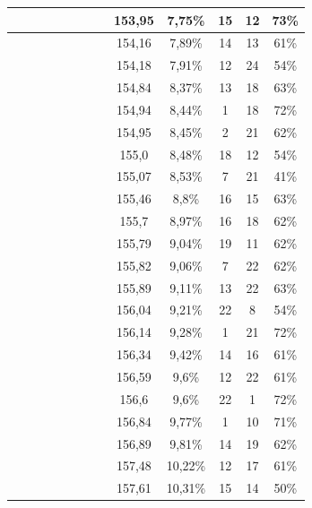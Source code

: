 \begin{center}
\begin{longtable}{|c|c|c|c|c|c|c|c|c|c|c|c|c|}
 \x &  &  &  &  \x &  \x &  &  \x & 153,95 & 7,75\% & 15 & 12 & 73\% \\ \hline
 \x &  &  \x &  &  \x &  &  &  \x & 154,16 & 7,89\% & 14 & 13 & 61\% \\ \hline
 \x &  \x &  &  \x &  &  &  &  \x & 154,18 & 7,91\% & 12 & 24 & 54\% \\ \hline
 \x &  \x &  \x &  \x &  &  &  \x &  \x & 154,84 & 8,37\% & 13 & 18 & 63\% \\ \hline
 \x &  &  &  \x &  \x &  \x &  \x &  \x & 154,94 & 8,44\% & 1 & 18 & 72\% \\ \hline
 \x &  \x &  \x &  \x &  &  &  \x &  \x & 154,95 & 8,45\% & 2 & 21 & 62\% \\ \hline
 \x &  \x &  &  \x &  &  &  \x &  \x & 155,0 & 8,48\% & 18 & 12 & 54\% \\ \hline
 \x &  &  &  &  &  &  &  \x & 155,07 & 8,53\% & 7 & 21 & 41\% \\ \hline
 \x &  \x &  \x &  &  \x &  &  \x &  \x & 155,46 & 8,8\% & 16 & 15 & 63\% \\ \hline
 \x &  &  \x &  \x &  \x &  &  \x &  \x & 155,7 & 8,97\% & 16 & 18 & 62\% \\ \hline
 \x &  \x &  \x &  \x &  \x &  &  &  \x & 155,79 & 9,04\% & 19 & 11 & 62\% \\ \hline
 \x &  \x &  \x &  &  &  &  \x &  \x & 155,82 & 9,06\% & 7 & 22 & 62\% \\ \hline
 \x &  &  \x &  \x &  &  &  \x &  \x & 155,89 & 9,11\% & 13 & 22 & 63\% \\ \hline
 \x &  \x &  &  &  &  &  \x &  \x & 156,04 & 9,21\% & 22 & 8 & 54\% \\ \hline
 \x &  &  &  \x &  &  \x &  &  \x & 156,14 & 9,28\% & 1 & 21 & 72\% \\ \hline
 \x &  \x &  &  &  \x &  &  \x &  \x & 156,34 & 9,42\% & 14 & 16 & 61\% \\ \hline
 \x &  &  &  \x &  \x &  &  \x &  \x & 156,59 & 9,6\% & 12 & 22 & 61\% \\ \hline
 \x &  &  &  &  &  \x &  \x &  \x & 156,6 & 9,6\% & 22 & 1 & 72\% \\ \hline
 \x &  &  \x &  &  \x &  \x &  \x &  \x & 156,84 & 9,77\% & 1 & 10 & 71\% \\ \hline
 \x &  &  \x &  &  &  &  \x &  \x & 156,89 & 9,81\% & 14 & 19 & 62\% \\ \hline
 \x &  \x &  &  \x &  \x &  &  \x &  \x & 157,48 & 10,22\% & 12 & 17 & 61\% \\ \hline
 \x &  &  &  \x &  &  &  \x &  \x & 157,61 & 10,31\% & 15 & 14 & 50\% \\ \hline

\end{longtable}
\end{center}
